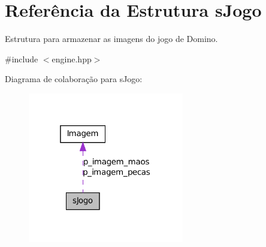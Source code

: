 \hypertarget{structsJogo}{
\section{Referência da Estrutura sJogo}
\label{structsJogo}
}


Estrutura para armazenar as imagens do jogo de Domino.  




{\ttfamily \#include $<$engine.hpp$>$}



Diagrama de colaboração para sJogo:\nopagebreak
\begin{figure}[H]
\begin{center}
\leavevmode
\includegraphics[width=193pt]{structsJogo__coll__graph}
\end{center}
\end{figure}
